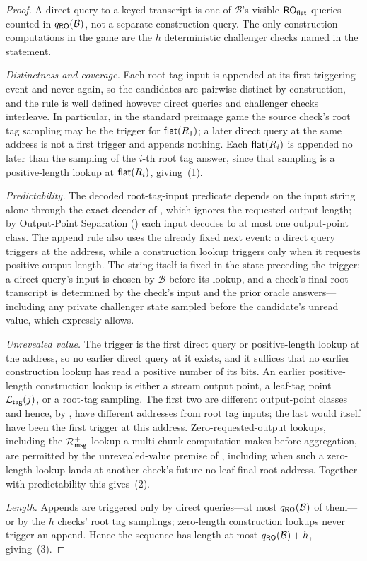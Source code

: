 \begin{proof}
A direct query to a keyed transcript is one of $\mathcal{B}$'s visible
$\mathsf{RO}_{\mathsf{flat}}$ queries counted in $q_{\mathsf{RO}}(\mathcal{B})$, not a separate
construction query. The only construction computations in the game are
the $h$ deterministic challenger checks named in the statement.

\emph{Distinctness and coverage.} Each root tag input is appended at its
first triggering event and never again, so the candidates are pairwise
distinct by construction, and the rule is well defined however direct
queries and challenger checks interleave. In particular, in the standard
preimage game the source check's root tag sampling may be the trigger for
$\mathsf{flat}(R_1)$; a later direct query at the same address is not a first
trigger and appends nothing. Each $\mathsf{flat}(R_i)$ is appended no later
than the sampling of the $i$-th root tag answer, since that sampling is a
positive-length lookup at $\mathsf{flat}(R_i)$, giving~(1).

\emph{Predictability.} The decoded root-tag-input predicate depends on
the input string alone through the exact decoder of
, which ignores the requested output length; by
Output-Point Separation () each input decodes to at
most one output-point class. The append rule also uses the already fixed
next event: a direct query triggers at the address, while a construction
lookup triggers only when it requests positive output length. The string
itself is fixed in the state preceding the trigger: a direct query's
input is chosen by $\mathcal{B}$ before its lookup, and a check's final
root transcript is determined by the check's input and the prior oracle
answers---including any private challenger state sampled before the
candidate's unread value, which  expressly
allows.

\emph{Unrevealed value.} The trigger is the first direct query or
positive-length lookup at the address, so no earlier direct query at it
exists, and it suffices that no earlier construction lookup has read a
positive number of its bits. An earlier positive-length construction
lookup is either a stream output point, a leaf-tag point $\mathcal{L}_{\mathsf{tag}}(j)$, or a
root-tag sampling. The first two are different output-point classes and
hence, by , have different addresses from root tag
inputs; the last would itself have been the first trigger at this
address. Zero-requested-output lookups, including the $\mathcal{R}_{\mathsf{msg}}^+$ lookup a
multi-chunk computation makes before aggregation, are permitted by the
unrevealed-value premise of , including
when such a zero-length lookup lands at another check's future no-leaf
final-root address. Together with predictability this gives~(2).

\emph{Length.} Appends are triggered only by direct queries---at most
$q_{\mathsf{RO}}(\mathcal{B})$ of them---or by the $h$ checks' root tag samplings;
zero-length construction lookups never trigger an append. Hence the
sequence has
length at most $q_{\mathsf{RO}}(\mathcal{B}) + h$, giving~(3).
\end{proof}

